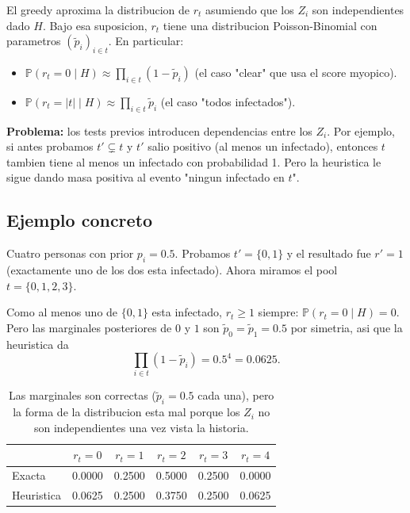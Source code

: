 \documentclass[11pt]{article}
\begin{document}
El greedy aproxima la distribucion de $r_t$ asumiendo que los $Z_i$
son independientes dado $H$. Bajo esa suposicion, $r_t$ tiene una
distribucion Poisson-Binomial con parametros $(\tilde p_i)_{i \in t}$.
En particular:
\begin{itemize}
  \item $\mathbb{P}(r_t = 0 \mid H) \approx \prod_{i \in t} (1 - \tilde p_i)$
    (el caso "clear" que usa el score myopico).
  \item $\mathbb{P}(r_t = \lvert t \rvert \mid H) \approx \prod_{i \in t} \tilde p_i$
    (el caso "todos infectados").
\end{itemize}

\textbf{Problema:} los tests previos introducen dependencias entre los
$Z_i$. Por ejemplo, si antes probamos $t' \subsetneq t$ y $t'$ salio
positivo (al menos un infectado), entonces $t$ tambien tiene al menos
un infectado con probabilidad 1. Pero la heuristica le sigue dando
masa positiva al evento "ningun infectado en $t$".

\subsection{Ejemplo concreto}

Cuatro personas con prior $p_i = 0.5$. Probamos $t' = \{0,1\}$ y el
resultado fue $r' = 1$ (exactamente uno de los dos esta infectado).
Ahora miramos el pool $t = \{0,1,2,3\}$.

Como al menos uno de $\{0,1\}$ esta infectado, $r_t \ge 1$ siempre:
$\mathbb{P}(r_t = 0 \mid H) = 0$. Pero las marginales posteriores de
$0$ y $1$ son $\tilde p_0 = \tilde p_1 = 0.5$ por simetria, asi que
la heuristica da
\[
\prod_{i \in t}(1 - \tilde p_i) = 0.5^4 = 0.0625.
\]

\begin{table}[h]
\centering
\begin{tabular}{lccccc}
\toprule
 & $r_t=0$ & $r_t=1$ & $r_t=2$ & $r_t=3$ & $r_t=4$ \\
\midrule
Exacta      & 0.0000 & 0.2500 & 0.5000 & 0.2500 & 0.0000 \\
Heuristica  & 0.0625 & 0.2500 & 0.3750 & 0.2500 & 0.0625 \\
\bottomrule
\end{tabular}
\caption{Las marginales son correctas ($\tilde p_i = 0.5$ cada una),
pero la forma de la distribucion esta mal porque los $Z_i$ no son
independientes una vez vista la historia.}
\end{table}
\end{document}
